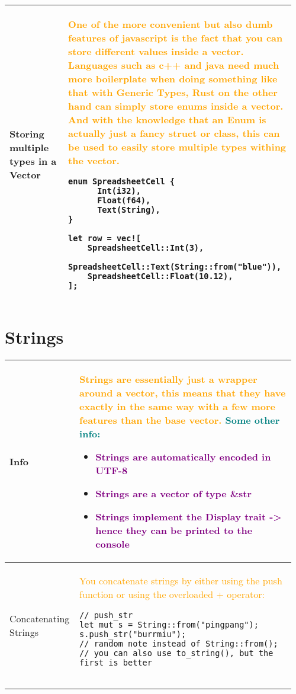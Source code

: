 \documentclass[main.tex,fontsize=8pt,paper=a4,paper=portrait,DIV=calc,]{scrartcl}
\begin{document}
\begin{table}[ht!]
\begin{tabular}{|m{0.2\linewidth}|m{0.755\linewidth}|}
\hline
Storing multiple types in a Vector & 
\textcolor{orange}{One of the more convenient but also dumb features of javascript is the fact that you can store different values inside a vector.\newline
Languages such as c++ and java need much more boilerplate when doing something like that with Generic Types, Rust on the other hand can simply store enums inside a vector.\newline
And with the knowledge that an Enum is actually just a fancy struct or class, this can be used to easily store multiple types withing the vector.}\newline
\begin{lstlisting}
enum SpreadsheetCell {
      Int(i32),
      Float(f64),
      Text(String),
}

let row = vec![
    SpreadsheetCell::Int(3),
    SpreadsheetCell::Text(String::from("blue")),
    SpreadsheetCell::Float(10.12),
];
\end{lstlisting}\\
\hline
\end{tabular}
\section{Strings}
\begin{tabular}{|m{0.2\linewidth}|m{0.755\linewidth}|}
\hline
Info  & 
\textcolor{orange}{Strings are essentially just a \textbf{wrapper around a vector}, this means that they have exactly in the same way with a few more features than the base vector.}
\textcolor{teal}{Some other info:}\newline
\begin{itemize}
\item \textcolor{purple}{Strings are automatically encoded in UTF-8}
\item \textcolor{purple}{Strings are a vector of type \&str}
\item \textcolor{purple}{Strings implement the \textbf{Display} trait -> hence they can be printed to the console}
\vspace{2mm}
\end{itemize}\\
\hline
Concatenating Strings & 
\textcolor{orange}{You concatenate strings by either using the push function or using the overloaded + operator:}\newline
\begin{lstlisting}
// push_str
let mut s = String::from("pingpang");
s.push_str("burrmiu");
// random note instead of String::from();
// you can also use to_string(), but the first is better


\end{lstlisting}
\end{tabular}
\end{table}
\end{document}
